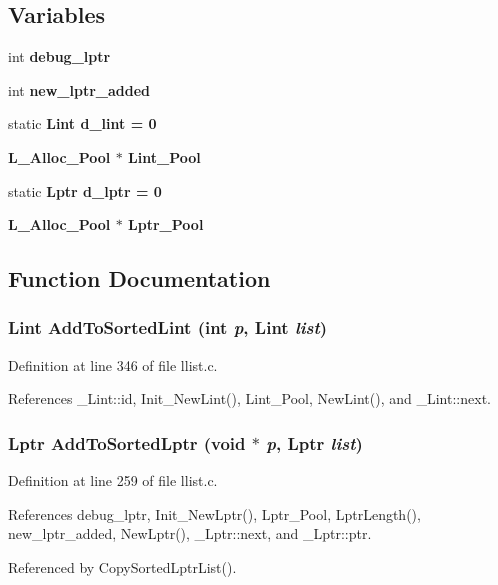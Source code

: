 \subsection*{Variables}
\begin{CompactItemize}
\item 
int \bf{debug\_\-lptr}
\item 
int \bf{new\_\-lptr\_\-added}
\item 
static \bf{Lint} \bf{d\_\-lint} = 0
\item 
\bf{L\_\-Alloc\_\-Pool} $\ast$ \bf{Lint\_\-Pool}
\item 
static \bf{Lptr} \bf{d\_\-lptr} = 0
\item 
\bf{L\_\-Alloc\_\-Pool} $\ast$ \bf{Lptr\_\-Pool}
\end{CompactItemize}


\subsection{Function Documentation}
\subsubsection{\setlength{\rightskip}{0pt plus 5cm}\bf{Lint} Add\-To\-Sorted\-Lint (int {\em p}, \bf{Lint} {\em list})}\label{llist_8c_144989866b0bd3f6c2848978d8525046}




Definition at line 346 of file llist.c.

References \_\-Lint::id, Init\_\-New\-Lint(), Lint\_\-Pool, New\-Lint(), and \_\-Lint::next.
\subsubsection{\setlength{\rightskip}{0pt plus 5cm}\bf{Lptr} Add\-To\-Sorted\-Lptr (void $\ast$ {\em p}, \bf{Lptr} {\em list})}\label{llist_8c_1f0ae7d6ec6c11395d4b9fe0b07dc2ce}




Definition at line 259 of file llist.c.

References debug\_\-lptr, Init\_\-New\-Lptr(), Lptr\_\-Pool, Lptr\-Length(), new\_\-lptr\_\-added, New\-Lptr(), \_\-Lptr::next, and \_\-Lptr::ptr.

Referenced by Copy\-Sorted\-Lptr\-List().
